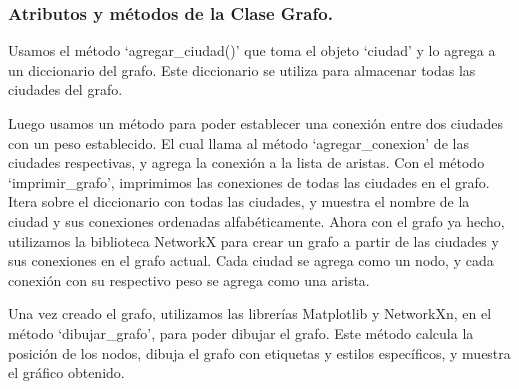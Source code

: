 \documentclass[12pt,oneside]{book}
\begin{document}
    \subsubsection{Atributos y métodos de la Clase Grafo.}
Usamos el método ‘agregar\_ciudad()’ que toma el objeto ‘ciudad’ y lo agrega a un diccionario del grafo. Este diccionario se utiliza para almacenar todas las ciudades del grafo.

Luego usamos un método para poder establecer una conexión entre dos ciudades con un peso establecido. El cual llama al método ‘agregar\_conexion’ de las ciudades respectivas, y agrega la conexión a la lista de aristas.
Con el método ‘imprimir\_grafo’, imprimimos las conexiones de todas las ciudades en el grafo. Itera sobre el diccionario con todas las ciudades, y muestra el nombre de la ciudad y sus conexiones ordenadas alfabéticamente.
Ahora con el grafo ya hecho, utilizamos la biblioteca NetworkX para crear un grafo a partir de las ciudades y sus conexiones en el grafo actual. Cada ciudad se agrega como un nodo, y cada conexión con su respectivo peso se agrega como una arista.

Una vez creado el grafo, utilizamos las librerías Matplotlib y NetworkXn, en el método ‘dibujar\_grafo’, para poder dibujar el grafo. Este método calcula la posición de los nodos, dibuja el grafo con etiquetas y estilos específicos, y muestra el gráfico obtenido.
\end{document}
